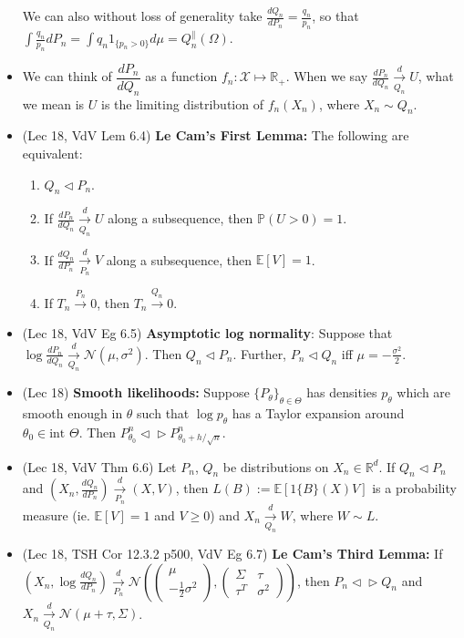\documentclass[twoside]{article}
\newcommand{\dis}{\displaystyle}
\newcommand\bbE{\mathbb{E}}
\newcommand\bbP{\mathbb{P}}
\newcommand\bbR{\mathbb{R}}
\newcommand\calN{\mathcal{N}}
\newcommand\calX{\mathcal{X}}
\newcommand\sg{\sigma}
\newcommand\Sg{\Sigma}
\def\t{\theta}
\newcommand\T{\Theta}
\begin{document}
\begin{itemize}
We can also without loss of generality take $\dis\frac{dQ_n}{dP_n} = \frac{q_n}{p_n}$, so that $\dis\int \frac{q_n}{p_n}dP_n = \int q_n 1_{\{p_n > 0\}} d\mu = Q_n^\|(\Omega)$.

\item We can think of $\dfrac{dP_n}{dQ_n}$ as a function $f_n: \calX \mapsto \bbR_+$. When we say $\dis\frac{dP_n}{dQ_n} \xrightarrow[Q_n]{d} U$, what we mean is $U$ is the limiting distribution of $f_n(X_n)$, where $X_n \sim Q_n$.

\item (Lec 18, VdV Lem 6.4) \textbf{Le Cam's First Lemma:} The following are equivalent:
\begin{enumerate}
\item $Q_n \triangleleft P_n$.
\item If $\dis\frac{dP_n}{dQ_n} \xrightarrow[Q_n]{d} U$ along a subsequence, then $\bbP(U > 0) = 1$.
\item If $\dis\frac{dQ_n}{dP_n} \xrightarrow[P_n]{d} V$ along a subsequence, then $\bbE[V] = 1$. 
\item If $T_n \xrightarrow{P_n} 0$, then $T_n \xrightarrow{Q_n} 0$.
\end{enumerate}

\item (Lec 18, VdV Eg 6.5) \textbf{Asymptotic log normality}: Suppose that $\log \dis\frac{dP_n}{dQ_n} \xrightarrow[Q_n]{d} \calN(\mu, \sg^2)$. Then $Q_n \triangleleft P_n$. Further, $P_n \triangleleft Q_n$ iff $\mu = -\dis\frac{\sg^2}{2}$.

\item (Lec 18) \textbf{Smooth likelihoods:} Suppose $\{ P_\t\}_{\t \in \T}$ has densities $p_\t$ which are smooth enough in $\t$ such that $\log p_\t$ has a Taylor expansion around $\t_0 \in \text{int } \T$. Then $P_{\t_0}^n \triangleleft\!\triangleright P_{\t_0 + h/\sqrt{n}}^n$.

\item (Lec 18, VdV Thm 6.6) Let $P_n$, $Q_n$ be distributions on $X_n \in \bbR^d$. If $Q_n \triangleleft P_n$ and $\left(X_n, \dis\frac{dQ_n}{dP_n}\right) \xrightarrow[P_n]{d} (X,V)$, then $L(B) := \bbE[1{\{B\}}(X)V]$ is a probability measure (ie. $\bbE[V] = 1$ and $V \geq 0$) and $X_n \xrightarrow[Q_n]{d} W$, where $W \sim L$.

\item (Lec 18, TSH Cor 12.3.2 p500, VdV Eg 6.7) \textbf{Le Cam's Third Lemma:} If $\left(X_n,\log \dis\frac{dQ_n}{dP_n}\right) \xrightarrow[P_n]{d} \calN\left( \begin{pmatrix} \mu \\ - \frac{1}{2} \sg^2 \end{pmatrix}, \begin{pmatrix} \Sg & \tau \\ \tau^T & \sg^2 \end{pmatrix} \right)$, then $P_n \triangleleft\!\triangleright Q_n$ and $X_n \xrightarrow[Q_n]{d} \calN(\mu + \tau, \Sigma)$.


\end{itemize}
\end{document}
